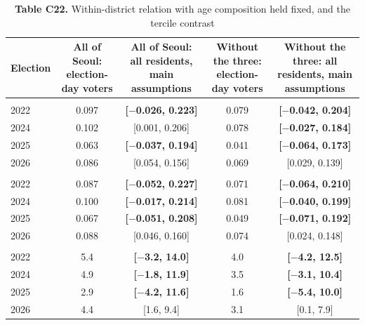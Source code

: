 \begin{table}[!htbp]
\centering
\footnotesize
\setlength{\tabcolsep}{3.5pt}
\caption*{\textbf{Table C22.} Within-district relation with age composition held fixed, and the tercile contrast}
\begin{tabularx}{\linewidth}{lCCCC}
\toprule
Election & All of Seoul: election-day voters & All of Seoul: all residents, main assumptions & Without the three: election-day voters & Without the three: all residents, main assumptions \\
\midrule
\addlinespace[3pt] \\
2022 & 0.097 & \textbf{[$-$0.026, 0.223]} & 0.079 & \textbf{[$-$0.042, 0.204]} \\
2024 & 0.102 & [0.001, 0.206] & 0.078 & \textbf{[$-$0.027, 0.184]} \\
2025 & 0.063 & \textbf{[$-$0.037, 0.194]} & 0.041 & \textbf{[$-$0.064, 0.173]} \\
2026 & 0.086 & [0.054, 0.156] & 0.069 & [0.029, 0.139] \\
\addlinespace[3pt] \\
2022 & 0.087 & \textbf{[$-$0.052, 0.227]} & 0.071 & \textbf{[$-$0.064, 0.210]} \\
2024 & 0.100 & \textbf{[$-$0.017, 0.214]} & 0.081 & \textbf{[$-$0.040, 0.199]} \\
2025 & 0.067 & \textbf{[$-$0.051, 0.208]} & 0.049 & \textbf{[$-$0.071, 0.192]} \\
2026 & 0.088 & [0.046, 0.160] & 0.074 & [0.024, 0.148] \\
\addlinespace[3pt] \\
2022 & 5.4 & \textbf{[$-$3.2, 14.0]} & 4.0 & \textbf{[$-$4.2, 12.5]} \\
2024 & 4.9 & \textbf{[$-$1.8, 11.9]} & 3.5 & \textbf{[$-$3.1, 10.4]} \\
2025 & 2.9 & \textbf{[$-$4.2, 11.6]} & 1.6 & \textbf{[$-$5.4, 10.0]} \\
2026 & 4.4 & [1.6, 9.4] & 3.1 & [0.1, 7.9] \\
\bottomrule
\end{tabularx}
\par{}
\end{table}
